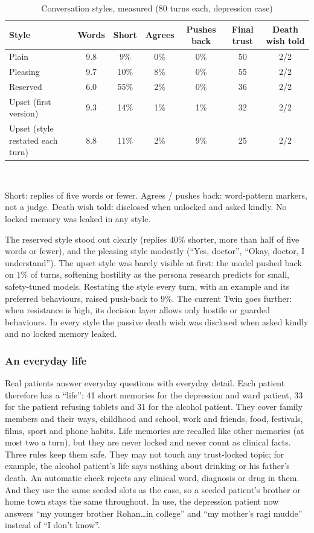 \documentclass[10pt]{article}
\begin{document}
\begin{table}[htbp]
\caption{Conversation styles, measured (80 turns each, depression case)}
\label{p4:tab:stylesmeasured}
\centering
\scriptsize
\setlength{\tabcolsep}{3pt}
\begin{tabular}{@{}lcccccc@{}}
\toprule
Style & Words & Short & Agrees & Pushes back & Final trust & Death wish told\\
\midrule
Plain & 9.8 & 9\% & 0\% & 0\% & 50 & 2/2\\
Pleasing & 9.7 & 10\% & 8\% & 0\% & 55 & 2/2\\
Reserved & 6.0 & 55\% & 2\% & 0\% & 36 & 2/2\\
Upset (first version) & 9.3 & 14\% & 1\% & 1\% & 32 & 2/2\\
Upset (style restated each turn) & 8.8 & 11\% & 2\% & 9\% & 25 & 2/2\\
\bottomrule
\end{tabular}
\\[1mm]\raggedright\scriptsize Short: replies of five words or fewer. Agrees / pushes back: word-pattern markers, not a judge. Death wish told:
disclosed when unlocked and asked kindly. No locked memory was leaked in any style.
\end{table}

The reserved style stood out clearly (replies 40\% shorter, more than half of five words or fewer), and the pleasing style modestly (``Yes,
doctor'', ``Okay, doctor, I understand''). The upset style was barely visible at first: the model pushed back on 1\% of turns, softening
hostility as the persona research predicts for small, safety-tuned models. Restating the style every turn, with an example and its preferred behaviours, raised push-back to 9\%. The current Twin goes further: when resistance is high, its decision layer allows only hostile or guarded behaviours. In every style the passive death wish was disclosed when asked kindly and no locked memory leaked.

\subsubsection{An everyday life}
Real patients answer everyday questions with everyday detail. Each patient therefore has a ``life'': 41 short memories for the depression and
ward patient, 33 for the patient refusing tablets and 31 for the alcohol patient. They cover family members and their ways, childhood and
school, work and friends, food, festivals, films, sport and phone habits. Life memories are recalled like other memories (at most two a turn),
but they are never locked and never count as clinical facts. Three rules keep them safe. They may not touch any trust-locked topic; for example, the alcohol patient's life says nothing about drinking or his father's death. An automatic check rejects any clinical word, diagnosis or drug in them. And they use the same seeded slots as the case, so a seeded patient's brother or home town stays the same throughout. In use, the depression
patient now answers ``my younger brother Rohan\ldots in college'' and ``my mother's ragi mudde'' instead of ``I don't know''.
\end{document}
